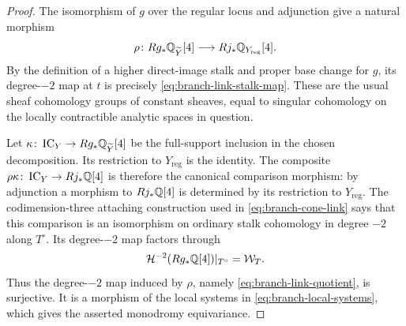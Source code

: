 \begin{proof}
The isomorphism of $g$ over the regular locus and adjunction give a
natural morphism
\[
 \rho\colon Rg_*\mathbb{Q}_{\widetilde Y}[4]
                     \longrightarrow Rj_*\mathbb{Q}_{Y_{\mathrm{reg}}}[4].
\]
By the definition of a higher direct-image stalk and proper base
change for $g$, its degree-$-2$ map at $t$ is precisely
\eqref{eq:branch-link-stalk-map}.  These are the usual sheaf
cohomology groups of constant sheaves, equal to singular cohomology
on the locally contractible analytic spaces in question.

Let $\kappa\colon\operatorname{IC}_Y\to Rg_*\mathbb{Q}_{\widetilde Y}[4]$ be the
full-support inclusion in the chosen decomposition.  Its restriction
to $Y_{\mathrm{reg}}$ is the identity.  The composite
$\rho\kappa\colon\operatorname{IC}_Y\to Rj_*\mathbb{Q}[4]$ is therefore the canonical
comparison morphism: by adjunction a morphism to $Rj_*\mathbb{Q}[4]$ is
determined by its restriction to $Y_{\mathrm{reg}}$.  The
codimension-three attaching construction used in
\eqref{eq:branch-cone-link} says that this comparison is an
isomorphism on ordinary stalk cohomology in degree $-2$ along
$T^\circ$.  Its degree-$-2$ map factors through
\[
 \mathcal H^{-2}(Rg_*\mathbb{Q}[4])|_{T^\circ}=\mathcal W_T.
\]
Thus the degree-$-2$ map induced by $\rho$, namely
\eqref{eq:branch-link-quotient}, is surjective.  It is a morphism of
the local systems in \eqref{eq:branch-local-systems}, which gives
the asserted monodromy equivariance.
\end{proof}
